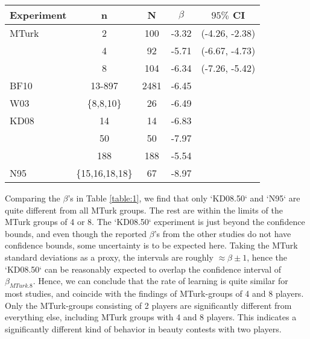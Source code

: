 \documentclass[12pt,review]{elsarticle}
\begin{document}
\begin{SCtable}
\begin{tabular}{lcccc}
\hline
Experiment	& n & N 	& $\beta$ & $95\%$ CI \\
\hline
MTurk	&	2			&	100	&	-3.32 & 	(-4.26, -2.38)	\\
	   	&	4			&	92 	&	-5.71 &	(-6.67, -4.73)	\\
	   	&	8			&	104	&	-6.34 &	(-7.26, -5.42)	\\
BF10	&	13-897		&	2481	&	-6.45 &\\
W03  	& \{8,8,10\} 	&	26	&	-6.49 &\\
KD08	& 14 			& 14 	&	-6.83 &\\
	   	& 50 			& 50 	&	-7.97 &\\
	   	& 188 			& 188 	&	-5.54 &\\
N95		&\{15,16,18,18\}& 67 	&	-8.97 &\\
\hline
\end{tabular}
\caption{Rates of learning in iterated p-beauty contest experiments with $p=2/3$. n = group size; N = number of subjects; $\beta$ = slope coefficient of means from round 1 to round 4 (for BF10, $\beta$ is calculated from round 1 to round 2 only).}
\label{table:1}
\end{SCtable}

Comparing the $\beta$'s in Table \ref{table:1}, we find that only `KD08.50` and `N95` are quite different from all MTurk groups. The rest are within the limits of the MTurk groups of 4 or 8. The `KD08.50` experiment is just beyond the confidence bounds, and even though the reported $\beta$'s from the other studies do not have confidence bounds, some uncertainty is to be expected here. Taking the MTurk standard deviations as a proxy, the intervals are roughly $\approx\beta\pm1$, hence the `KD08.50` can be reasonably expected to overlap the confidence interval of $\beta_{MTurk.8}$. Hence, we can conclude that the rate of learning is quite similar for most studies, and coincide with the findings of MTurk-groups of 4 and 8 players. Only the MTurk-groups consisting of 2 players are significantly different from everything else, including MTurk groups with 4 and 8 players. This indicates a significantly different kind of behavior in beauty contests with two players.
\end{document}
